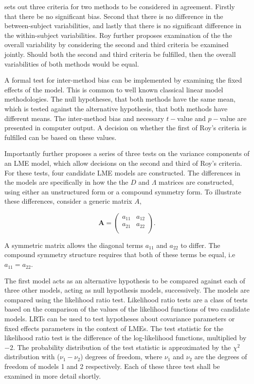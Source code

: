 \documentclass[12pt, a4paper]{report}
\theoremstyle{plain}
\theoremstyle{definition}
\theoremstyle{remark}
\begin{document}
\citet{ARoy2009} sets out three criteria for two methods to be considered in agreement. Firstly that there be no significant bias. Second that there is no difference in the between-subject variabilities, and lastly that there is no significant difference in the within-subject variabilities. Roy further proposes examination of the the overall variability by considering the second and third criteria be examined jointly. Should both the second and third criteria be fulfilled, then the overall variabilities of both methods would be equal.

A formal test for inter-method bias can be implemented by examining the fixed effects of the model. This is common to well known classical linear model methodologies. The null hypotheses, that both methods have the same mean, which is tested against the alternative hypothesis, that both methods have different means.
The inter-method bias and necessary $t-$value and $p-$value are presented in computer output. A decision on whether the first of Roy's criteria is fulfilled can be based on these values.

Importantly \citet{ARoy2009} further proposes a series of three tests on the variance components of an LME model, which allow decisions on the second and third of Roy's criteria. For these tests, four candidate LME models are constructed. The differences in the models are specifically in how the the $D$ and $\Lambda$ matrices are constructed, using either an unstructured form or a compound symmetry form. To illustrate these differences, consider a generic matrix $A$,

\[
\boldsymbol{A} = \left( \begin{array}{cc}
a_{11} & a_{12}  \\
a_{21} & a_{22}  \\
\end{array}\right).
\]

A symmetric matrix allows the diagonal terms $a_{11}$ and $a_{22}$ to differ. The compound symmetry structure requires that both of these terms be equal, i.e $a_{11} = a_{22}$.

The first model acts as an alternative hypothesis to be compared against each of three other models, acting as null hypothesis models, successively. The models are compared using the likelihood ratio test. Likelihood ratio tests are a class of tests based on the comparison of the values of the likelihood functions of two candidate models. LRTs can be used to test hypotheses about covariance parameters or fixed effects parameters in the context of LMEs. The test statistic for the likelihood ratio test is the difference of the log-likelihood functions, multiplied by $-2$.
The probability distribution of the test statistic is approximated by the $\chi^2$ distribution with ($\nu_{1} - \nu_{2}$) degrees of freedom, where $\nu_{1}$ and $\nu_{2}$ are the degrees of freedom of models 1 and 2 respectively. Each of these three test shall be examined in more detail shortly.
\end{document}
